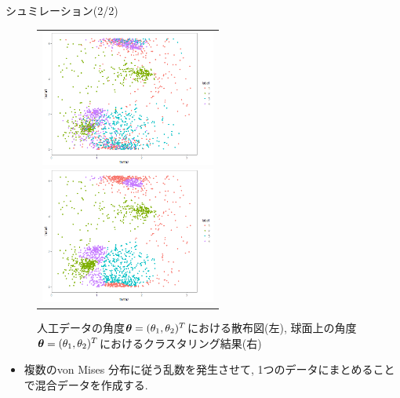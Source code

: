 \documentclass[dvipdfmx]{beamer} %
\newcommand{\bm}[1]{\mbox{\boldmath $#1$}}
\begin{document}
\begin{frame}{シュミレーション(2/2)}

\vspace{-1zh}
\begin{figure}[H]
\begin{tabular}{c}

\begin{minipage}{0.5\hsize}
\begin{center}
\includegraphics[clip,height= 45mm]{data/real.png}
\end{center}
\end{minipage}

\begin{minipage}{0.5\hsize}
\begin{center}
\includegraphics[clip,height= 45mm]{data/pred.png}
\end{center}
\end{minipage}
\end{tabular}
\caption{人工データの角度$\bm \theta = (\theta_1, \theta_2)^T$における散布図(左), 球面上の角度$\bm \theta = (\theta_1, \theta_2)^T$におけるクラスタリング結果(右)}
\end{figure}

\begin{itemize}
\item
複数のvon Mises 分布に従う乱数を発生させて, 1つのデータにまとめることで混合データを作成する.
\end{itemize}

\end{frame}

\end{document}
